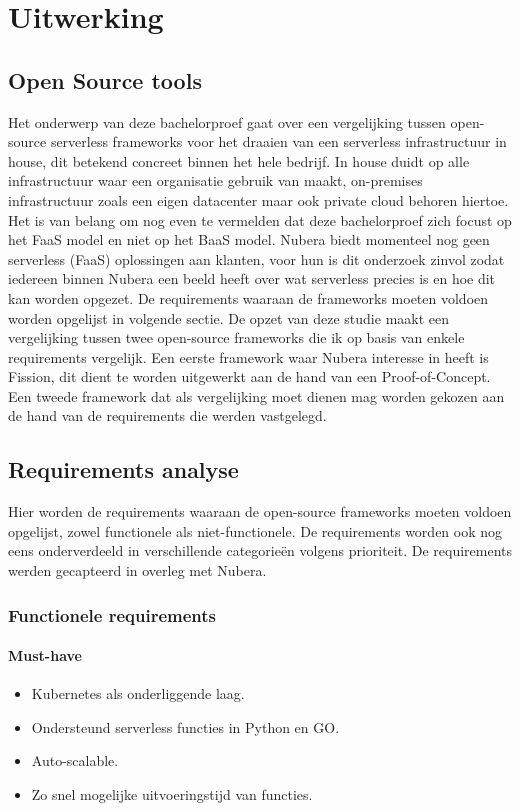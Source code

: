 \chapter{Uitwerking}
\label{ch:uitwerking}
\section{Open Source tools}
Het onderwerp van deze bachelorproef gaat over een vergelijking tussen open-source serverless frameworks voor het draaien van een serverless infrastructuur in house, dit betekend concreet binnen het hele bedrijf. In house duidt op alle infrastructuur waar een organisatie gebruik van maakt, on-premises infrastructuur zoals een eigen datacenter maar ook private cloud behoren hiertoe. Het is van belang om nog even te vermelden dat deze bachelorproef zich focust op het FaaS model en niet op het BaaS model. Nubera biedt momenteel nog geen serverless (FaaS) oplossingen aan klanten, voor hun is dit onderzoek zinvol zodat iedereen binnen Nubera een beeld heeft over wat serverless precies is en hoe dit kan worden opgezet. De requirements waaraan de frameworks moeten voldoen worden opgelijst in volgende sectie. De opzet van deze studie maakt een vergelijking tussen twee open-source frameworks die ik op basis van enkele requirements vergelijk. Een eerste framework waar Nubera interesse in heeft is Fission, dit dient te worden uitgewerkt aan de hand van een Proof-of-Concept. Een tweede framework dat als vergelijking moet dienen mag worden gekozen aan de hand van de requirements die werden vastgelegd.

\section{Requirements analyse}
Hier worden de requirements waaraan de open-source frameworks moeten voldoen opgelijst, zowel functionele als niet-functionele. De requirements worden ook nog eens onderverdeeld in verschillende categorieën volgens prioriteit. De requirements werden gecapteerd in overleg met Nubera.

\subsection{Functionele requirements}
\subsubsection{Must-have}
\begin{itemize}
    \item Kubernetes als onderliggende laag.
    \item Ondersteund serverless functies in Python en GO.
    \item Auto-scalable.
    \item Zo snel mogelijke uitvoeringstijd van functies.
\end{itemize}
